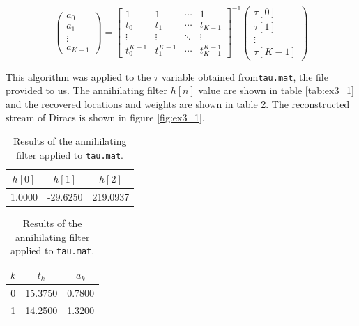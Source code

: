 \documentclass[a4paper]{article}
\begin{document}
\begin{equation}
\begin{pmatrix}
a_0 \\
a_1 \\
\vdots \\
a_{K-1}
\end{pmatrix}
=
\begin{bmatrix}
1 & 1 & \dotsb & 1 \\
t_0 & t_1 & \dotsb & t_{K-1} \\
\vdots & \vdots & \ddots & \vdots \\
t^{K-1}_{0} & t^{K-1}_{1} & \dotsb & t^{K-1}_{K-1}
\end{bmatrix}^{-1}
\begin{pmatrix}
\tau[0] \\
\tau[1] \\
\vdots \\
\tau[K-1]
\end{pmatrix}
\end{equation}
\label{eq:ex3_2}

This algorithm was applied to the $\tau$ variable obtained from\texttt{tau.mat}, the file provided to us. The annihilating filter $h[n]$ value are shown in table \ref{tab:ex3_1} and the recovered locations and weights are shown in table \ref{tab:ex3_2}. The reconstructed stream of Diracs is shown in figure \ref{fig:ex3_1}.

\begin{table}[H]
    \parbox{.45\linewidth}{
    \centering
    \begin{tabular}{|c|c|c|}
        \hline
        $h[0]$     & $h[1]$     & $h[2]$ \\ \hline
        1.0000       & -29.6250  & 219.0937\\ \hline
    \end{tabular}
    \caption{The annihilating filter coefficients.}
    \label{tab:ex3_1}
    }
    \hfill
    \parbox{.45\linewidth}{
    \centering
    \begin{tabular}{|c|c|c|}
        \hline
        $k$     & $t_k$     & $a_k$ \\ \hline
        0       & 15.3750   & 0.7800\\ \hline
        1       & 14.2500   & 1.3200\\ \hline
    \end{tabular}
    \caption{Results of the annihilating filter applied to \texttt{tau.mat}.}
    \label{tab:ex3_2}
    }
\end{table}
\end{document}
